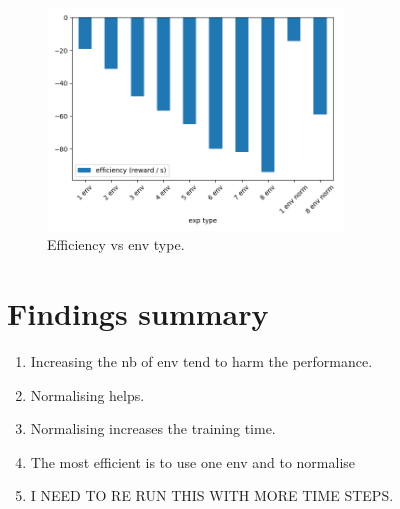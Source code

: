 \documentclass{article}
\begin{document}
\begin{figure}[H]
    \centering
    \includegraphics[width=0.7\textwidth]{../efficiency_by_exp_type.png}
\caption{Efficiency vs env type.}
\end{figure}




\section{Findings summary}

\begin{enumerate}
  \item Increasing the nb of env tend to harm the performance.
  \item Normalising helps.
  \item Normalising increases the training time.
  \item The most efficient is to use one env and to normalise
  \item I NEED TO RE RUN THIS WITH MORE TIME STEPS.
\end{enumerate}
 
\end{document}
